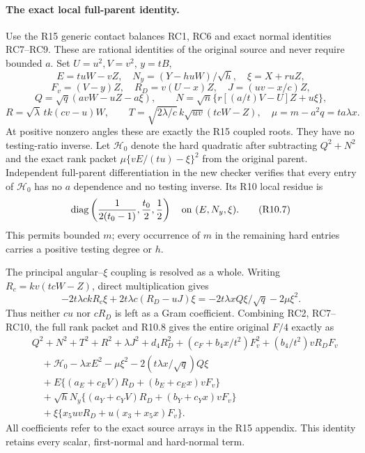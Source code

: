 \paragraph{The exact local full-parent identity.}
Use the R15 generic contact balances RC1, RC6 and exact normal
identities RC7--RC9. These are rational identities of the original
source and never require bounded $a$. Set $U=u^2,V=v^2$, $y=tB$,
\[
 E=tuW-vZ,\quad N_y=(Y-huW)/\sqrt h,\quad \xi=X+ruZ,
\]
\[
 F_v=(V-y)Z,\quad R_D=v(U-x)Z,\quad J=(uv-x/c)Z,
\]
\[
 Q=\sqrt q(avW-uZ-a\xi),\qquad
 N=\sqrt n\{r[(a/t)V-U]Z+u\xi\},
\]
\[
 R=\sqrt\lambda\,tk(cv-u)W,\qquad
 T=\sqrt{2\lambda/c}\,k\sqrt{uv}(tcW-Z),\quad
 \mu=m-a^2q=ta\lambda x.
\]
At positive nonzero angles these are exactly the R15 coupled roots.
They have no testing-ratio inverse. Let $\mathcal H_0$ denote the
hard quadratic after subtracting $Q^2+N^2$ and the exact rank packet
$\mu\{vE/(tu)-\xi\}^2$ from the original parent. Independent
full-parent differentiation in the new checker verifies that every
entry of $\mathcal H_0$ has no $a$ dependence and no testing inverse.
Its R10 local residue is
\[
 \operatorname{diag}\left(\frac1{2(t_0-1)},\frac{t_0}2,\frac12\right)
 \quad\hbox{on }(E,N_y,\xi).
\tag{R10.7}
\]
This permits bounded $m$; every occurrence of $m$ in the remaining
hard entries carries a positive testing degree or $h$.

The principal angular--$\xi$ coupling is resolved as a whole.
Writing $R_c=kv(tcW-Z)$, direct multiplication gives
\[
 -2t\lambda ck R_c\xi+2t\lambda c(R_D-uJ)\xi
 =-2t\lambda x Q\xi/\sqrt q-2\mu\xi^2.
\tag{R10.8}
\]
Thus neither $cu$ nor $cR_D$ is left as a Gram coefficient. Combining
RC2, RC7--RC10, the full rank packet and R10.8 gives the entire
original $F/4$ exactly as
\[
\begin{split}
 &Q^2+N^2+T^2+R^2+\lambda J^2+d_4R_D^2
 +(c_F+b_4x/t^2)F_v^2+(b_4/t^2)vR_DF_v\\
 &\quad+\mathcal H_0-\lambda xE^2-\mu\xi^2
                  -2(t\lambda x/\sqrt q)Q\xi\\
 &\quad+E\{(a_E+c_EV)R_D+(b_E+c_Ex)vF_v\}\\
 &\quad+\sqrt hN_y\{(a_Y+c_YV)R_D+(b_Y+c_Yx)vF_v\}\\
 &\quad+\xi\{x_5uvR_D+u(x_3+x_5x)F_v\}.
\end{split}
\tag{R10.9}
\]
All coefficients refer to the exact source arrays in the R15 appendix.
This identity retains every scalar, first-normal and hard-normal term.

